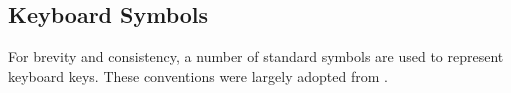 \subsection{Keyboard Symbols}
\label{sec:intro:keyboard_symbols}
For brevity and consistency, a number of standard symbols are used to represent keyboard keys.  These conventions were largely adopted from .

\newcommand{\shiftkey}      {\textsf{⇧}} %
\newcommand{\controlkey}    {\textsf{⌃}} %
\newcommand{\optionkey}     {\textsf{⌥}} %
\newcommand{\commandkey}    {\textsf{⌘}} %
\newcommand{\deleterightkey}{\textsf{⌦}} %
\newcommand{\deleteleftkey} {\textsf{⌫}} %
\newcommand{\escapekey}     {\textsf{⎋}} %
\newcommand{\returnkey}     {\textsf{↩}} %
\newcommand{\leftkey}       {\textsf{←}} %
\newcommand{\upkey}         {\textsf{↑}} %
\newcommand{\rightkey}      {\textsf{→}} %
\newcommand{\downkey}       {\textsf{↓}} %
\newcommand{\tabkey}        {\textsf{⇥}} %
